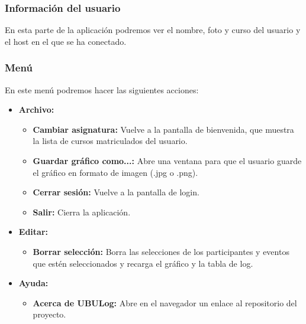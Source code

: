 \subsubsection{Información del usuario}

En esta parte de la aplicación podremos ver el nombre, foto y curso del usuario y el host en el que se ha conectado.


\subsubsection{Menú}


En este menú podremos hacer las siguientes acciones:

\begin{itemize}
	\tightlist
	\item
	\textbf{Archivo:}
	\begin{itemize}
		\tightlist
		\item
		\textbf{Cambiar asignatura:} Vuelve a la pantalla de bienvenida, que muestra la lista de cursos matriculados del usuario.
		\item
		\textbf{Guardar gráfico como...:} Abre una ventana para que el usuario guarde el gráfico en formato de imagen (.jpg o .png).
		\item
		\textbf{Cerrar sesión:} Vuelve a la pantalla de login.
		\item
		\textbf{Salir:} Cierra la aplicación.
	\end{itemize}
	\item
	\textbf{Editar:}
	\begin{itemize}
		\tightlist
		\item
		\textbf{Borrar selección:} Borra las selecciones de los participantes y eventos que estén seleccionados y recarga el gráfico y la tabla de log.
	\end{itemize}
	\item
	\textbf{Ayuda:}
	\begin{itemize}
		\tightlist
		\item
		\textbf{Acerca de UBULog:} Abre en el navegador un enlace al repositorio del proyecto.
	\end{itemize}
\end{itemize}










